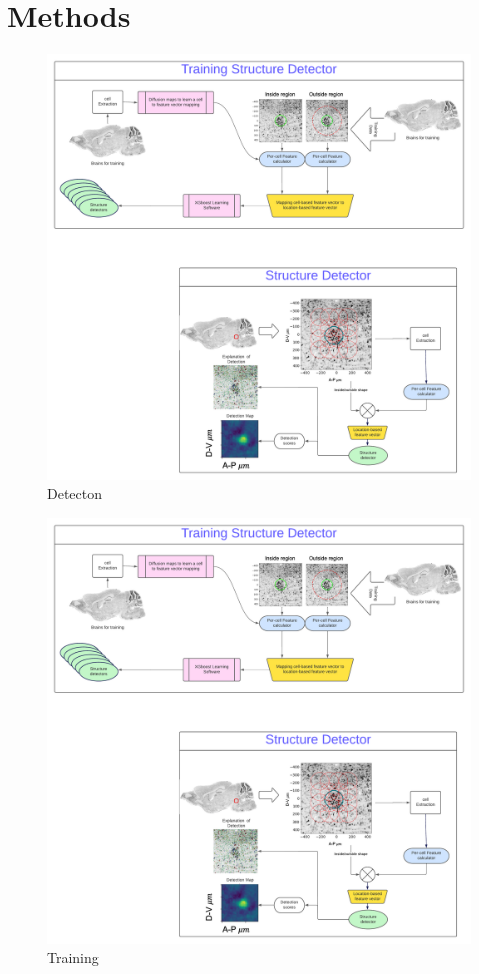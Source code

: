 \documentclass[runningheads]{llncs}
\begin{document}
\section{Methods}
\begin{figure}[t]
  \includegraphics[width=\textwidth]{figures/detection.pdf}
  \caption{Detecton \label{fig:detection}}
\end{figure}

\begin{figure}[t]
  \includegraphics[width=\textwidth]{figures/Training.pdf}
  \caption{Training \label{fig:training}}
\end{figure}
\end{document}
